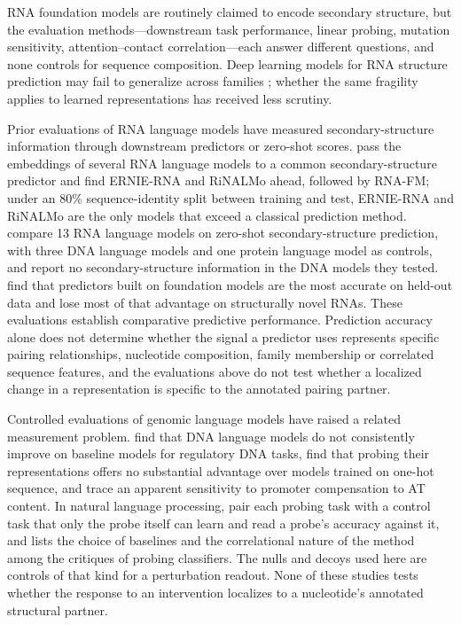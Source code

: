 \documentclass[11pt]{article}
\begin{document}
RNA foundation models are routinely claimed to encode secondary structure,
but the evaluation methods---downstream task performance, linear probing,
mutation sensitivity, attention--contact correlation---each answer different
questions, and none controls for sequence composition. Deep learning models
for RNA structure prediction may fail to generalize across families
\citep{szikszai2022generalization}; whether the same fragility applies to
learned representations has received less scrutiny.

Prior evaluations of RNA language models have measured secondary-structure
information through downstream predictors or zero-shot scores.
\citet{zablocki2025benchmarking} pass the embeddings of several RNA language
models to a common secondary-structure predictor and find ERNIE-RNA and RiNALMo
ahead, followed by RNA-FM; under an 80\% sequence-identity split between
training and test, ERNIE-RNA and RiNALMo are the only models that exceed a
classical prediction method. \citet{wang2025comparative} compare 13 RNA
language models on zero-shot secondary-structure prediction, with three DNA
language models and one protein language model as controls, and report no
secondary-structure information in the DNA models they tested.
\citet{chen2026fair} find that predictors built on foundation models are the
most accurate on held-out data and lose most of that advantage on structurally
novel RNAs. These evaluations establish comparative predictive performance.
Prediction accuracy alone does not determine whether the signal a predictor
uses represents specific pairing relationships, nucleotide composition, family
membership or correlated sequence features, and the evaluations above do not
test whether a localized change in a representation is specific to the
annotated pairing partner.

Controlled evaluations of genomic language models have raised a related
measurement problem. \citet{patel2024dart} find that DNA language models do not
consistently improve on baseline models for regulatory DNA tasks,
\citet{tang2025evaluating} find that probing their representations offers no
substantial advantage over models trained on one-hot sequence, and
\citet{cheng2026mechanistic} trace an apparent sensitivity to promoter
compensation to AT content. In natural language processing,
\citet{hewitt2019designing} pair each probing task with a control task that
only the probe itself can learn and read a probe's accuracy against it, and
\citet{belinkov2022probing} lists the choice of baselines and the correlational
nature of the method among the critiques of probing classifiers. The nulls and
decoys used here are controls of that kind for a perturbation readout. None of
these studies tests whether the response to an intervention localizes to a
nucleotide's annotated structural partner.
\end{document}
